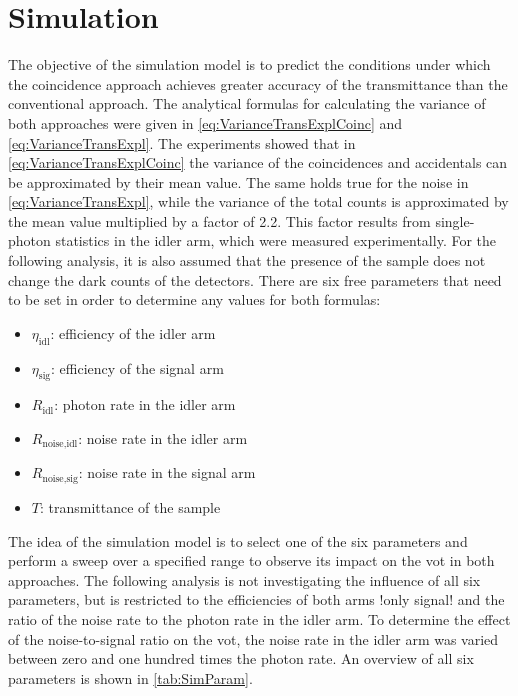 \section{Simulation}
The objective of the simulation model is to predict the conditions under which the coincidence approach achieves greater accuracy of the transmittance than the conventional approach. The analytical formulas for calculating the variance of both approaches were given in \autoref{eq:VarianceTransExplCoinc} and \ref{eq:VarianceTransExpl}. The experiments showed that in \autoref{eq:VarianceTransExplCoinc} the variance of the coincidences and accidentals can be approximated by their mean value. The same holds true for the noise in \autoref{eq:VarianceTransExpl}, while the variance of the total counts is approximated by the mean value multiplied by a factor of 2.2. This factor results from single-photon statistics in the idler arm, which were measured experimentally. For the following analysis, it is also assumed that the presence of the sample does not change the dark counts of the detectors. \newline
There are six free parameters that need to be set in order to determine any values for both formulas:
\begin{itemize}[topsep=0pt, partopsep=0pt, itemsep=1.5pt, parsep=0pt, leftmargin=3em]
	\item $\eta_{\text{idl}}$: efficiency of the idler arm
	\item $\eta_{\text{sig}}$: efficiency of the signal arm
	\item $R_{\text{idl}}$: photon rate in the idler arm
	\item $R_{\text{noise,idl}}$: noise rate in the idler arm
	\item $R_{\text{noise,sig}}$: noise rate in the signal arm
	\item $T$: transmittance of the sample 
\end{itemize}
The idea of the simulation model is to select one of the six parameters and perform a sweep over a specified range to observe its impact on the \acrshort{vot} in both approaches. The following analysis is not investigating the influence of all six parameters, but is restricted to the efficiencies of both arms !only signal! and the ratio of the noise rate to the photon rate in the idler arm. \newline
To determine the effect of the noise-to-signal ratio on the \acrshort{vot}, the noise rate in the idler arm was varied between zero and one hundred times the photon rate. An overview of all six parameters is shown in \autoref{tab:SimParam}.
